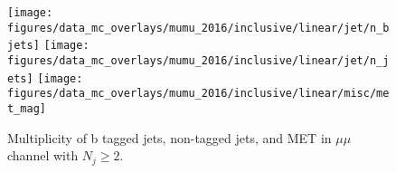 \begin{figure}[htb!]
    \centering
    \texttt{[image: figures/data\_mc\_overlays/mumu\_2016/inclusive/linear/jet/n\_bjets]}
    \texttt{[image: figures/data\_mc\_overlays/mumu\_2016/inclusive/linear/jet/n\_jets]}
    \texttt{[image: figures/data\_mc\_overlays/mumu\_2016/inclusive/linear/misc/met\_mag]}
    \caption{Multiplicity of b tagged jets, non-tagged jets, and MET in
    $\mu\mu$ channel with $N_{j} \geq 2$.}
    \label{fig:ee_jetmet}
\end{figure}

